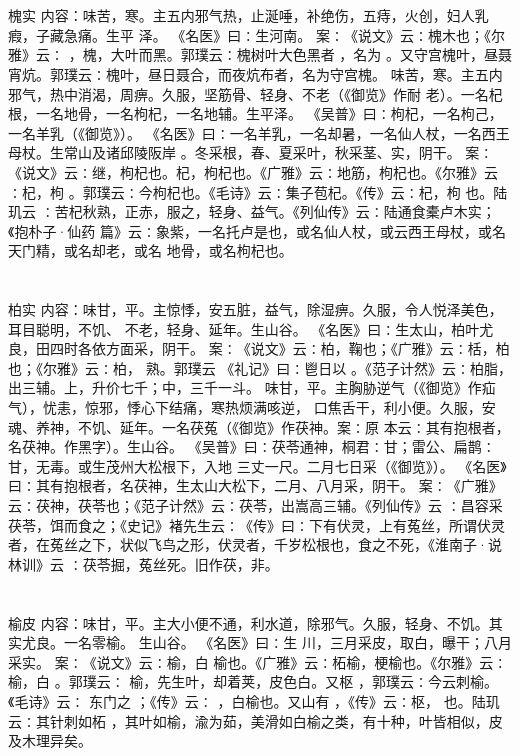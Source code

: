 \documentclass[12pt,UTF8]{ctexbook}
\begin{document}
\chapter{}槐实
内容：味苦，寒。主五内邪气热，止涎唾，补绝伤，五痔，火创，妇人乳瘕，子藏急痛。生平 
泽。 
《名医》曰∶生河南。 
案∶《说文》云∶槐木也；《尔雅》云∶ ，槐，大叶而黑。郭璞云∶槐树叶大色黑者 
，名为 。又守宫槐叶，昼聂宵炕。郭璞云∶槐叶，昼日聂合，而夜炕布者，名为守宫槐。 
味苦，寒。主五内邪气，热中消渴，周痹。久服，坚筋骨、轻身、不老（《御览》作耐 
老）。一名杞根，一名地骨，一名枸杞，一名地辅。生平泽。 
《吴普》曰∶枸杞，一名枸己，一名羊乳（《御览》）。 
《名医》曰∶一名羊乳，一名却暑，一名仙人杖，一名西王母杖。生常山及诸邱陵阪岸 
。冬采根，春、夏采叶，秋采茎、实，阴干。 
案∶《说文》云∶继，枸杞也。杞，枸杞也。《广雅》云∶地筋，枸杞也。《尔雅》云 
∶杞，枸 。郭璞云∶今枸杞也。《毛诗》云∶集子苞杞。《传》云∶杞，枸 也。陆玑云 
∶苦杞秋熟，正赤，服之，轻身、益气。《列仙传》云∶陆通食橐卢木实；《抱朴子·仙药 
篇》云∶象紫，一名托卢是也，或名仙人杖，或云西王母杖，或名天门精，或名却老，或名 
地骨，或名枸杞也。 


\chapter{}柏实
内容：味甘，平。主惊悸，安五脏，益气，除湿痹。久服，令人悦泽美色，耳目聪明，不饥、 
不老，轻身、延年。生山谷。 
《名医》曰∶生太山，柏叶尤良，田四时各依方面采，阴干。 
案∶《说文》云∶柏，鞠也；《广雅》云∶栝，柏也；《尔雅》云∶柏， 熟。郭璞云 
《礼记》曰∶鬯日以 。《范子计然》云∶柏脂，出三辅。上，升价七千；中，三千一斗。 
味甘，平。主胸胁逆气（《御览》作疝气），忧恚，惊邪，悸心下结痛，寒热烦满咳逆， 
口焦舌干，利小便。久服，安魂、养神，不饥、延年。一名茯菟（《御览》作茯神。案∶原 
本云∶其有抱根者，名茯神。作黑字）。生山谷。 
《吴普》曰∶茯苓通神，桐君∶甘；雷公、扁鹊∶甘，无毒。或生茂州大松根下，入地 
三丈一尺。二月七日采（《御览》）。 
《名医》曰∶其有抱根者，名茯神，生太山大松下，二月、八月采，阴干。 
案∶《广雅》云∶茯神，茯苓也；《范子计然》云∶茯苓，出嵩高三辅。《列仙传》云 
∶昌容采茯苓，饵而食之；《史记》褚先生云∶《传》曰∶下有伏灵，上有菟丝，所谓伏灵 
者，在菟丝之下，状似飞鸟之形，伏灵者，千岁松根也，食之不死，《淮南子·说林训》云 
∶茯苓掘，菟丝死。旧作茯，非。 


\chapter{}榆皮
内容：味甘，平。主大小便不通，利水道，除邪气。久服，轻身、不饥。其实尤良。一名零榆。 
生山谷。 
《名医》曰∶生 川，三月采皮，取白，曝干；八月采实。 
案∶《说文》云∶榆，白 榆也。《广雅》云∶柘榆，梗榆也。《尔雅》云∶榆，白 
。郭璞云∶ 榆，先生叶，却着荚，皮色白。又枢 ，郭璞云∶今云刺榆。《毛诗》云∶ 
东门之 ；《传》云∶ ，白榆也。又山有 ，《传》云∶枢， 也。陆玑云∶其针刺如柘 
，其叶如榆，渝为茹，美滑如白榆之类，有十种，叶皆相似，皮及木理异矣。 
\end{document}
